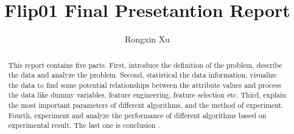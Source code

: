 \documentclass{amsart}
\begin{document}
%
%
\title[Xu's report]{Flip01 Final Presetantion Report}%

\author{Rongxin Xu}
\address[A.~1]{School of Business Administration,\\ 
Hunan University, Changsha 410012, China}%

%
%
\date{\gitAuthorDate}%

\begin{abstract}
This report contains five parts. 
First, 
introduce the definition of the problem,
describe the data and analyze the problem. 
Second, 
statistical the data information, 
visualize the data to find some potential relationships 
between the attribute values 
and process the data 
like dummy variables, feature engineering, feature selection etc. 
Third, 
explain the most important parameters 
of different algorithms,
and the method of experiment.
Fourth,
experiment and 
analyze the performance of different algorithms
based on experimental result.
The last one is conclusion . 
\end{abstract}

\maketitle
\tableofcontents

\newpage



\newpage



\listoftodos
\end{document}
